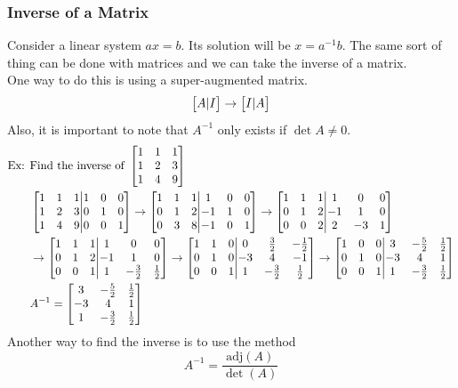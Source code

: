\documentclass[11pt, fleqn]{article}
\begin{document}
\subsubsection{Inverse of a Matrix}
Consider a linear system $ax=b$. Its solution will be $x=a^{-1}b$. The same sort of thing can be done with matrices and we can take the inverse of a matrix.\\
One way to do this is using a super-augmented matrix.
$$\matrixx{A|I}\to\matrixx{I|A}$$
Also, it is important to note that $A^{-1}$ only exists if $\det A\neq 0$.
\begin{align*}
    \text{Ex: }&\text{Find the inverse of }\matrixx{1&1&1\\1&2&3\\1&4&9}\\
    &\augmatrix{1&1&1\\1&2&3\\1&4&9}{1&0&0\\0&1&0\\0&0&1}\to\augmatrix{1&1&1\\0&1&2\\0&3&8}{1&0&0\\-1&1&0\\-1&0&1}\to\augmatrix{1&1&1\\0&1&2\\0&0&2}{1&0&0\\-1&1&0\\2&-3&1}\\
    &\to\augmatrix{1&1&1\\0&1&2\\0&0&1}{1&0&0\\-1&1&0\\1&-\frac{3}{2}&\frac{1}{2}}\to\augmatrix{1&1&0\\0&1&0\\0&0&1}{0&\frac{3}{2}&-\frac{1}{2}\\-3&4&-1\\1&-\frac{3}{2}&\frac{1}{2}}\to\augmatrix{1&0&0\\0&1&0\\0&0&1}{3&-\frac{5}{2}&\frac{1}{2}\\-3&4&1\\1&-\frac{3}{2}&\frac{1}{2}}\\
    &A^{-1}=\matrixx{3&-\frac{5}{2}&\frac{1}{2}\\-3&4&1\\1&-\frac{3}{2}&\frac{1}{2}}
\end{align*}
Another way to find the inverse is to use the method
$$A^{-1}=\frac{\mathrm{adj}(A)}{\det(A)}$$
\end{document}
